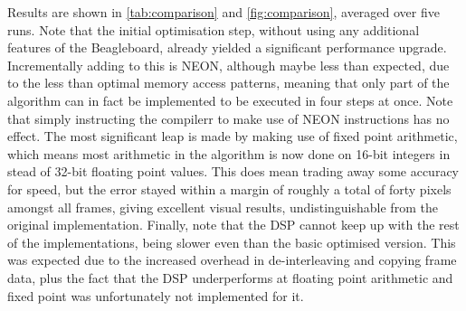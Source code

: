 \documentclass[final]{article}
\begin{document}
Results are shown in \cref{tab:comparison} and \cref{fig:comparison}, averaged over five runs. Note that the initial optimisation step, without using any additional features of the Beagleboard, already yielded a significant performance upgrade.
Incrementally adding to this is NEON, although maybe less than expected, due to the less than optimal memory access patterns, meaning that only part of the algorithm can in fact be implemented to be executed in four steps at once.
Note that simply instructing the compilerr to make use of NEON instructions has no effect.
The most significant leap is made by making use of fixed point arithmetic, which means most arithmetic in the algorithm is now done on 16-bit integers in stead of 32-bit floating point values.
This does mean trading away some accuracy for speed, but the error stayed within a margin of roughly a total of forty pixels amongst all frames, giving excellent visual results, undistinguishable from the original implementation.
Finally, note that the DSP cannot keep up with the rest of the implementations, being slower even than the basic optimised version. This was expected due to the increased overhead in de-interleaving and copying frame data, plus the fact that the DSP underperforms at floating point arithmetic and fixed point was unfortunately not implemented for it.
\end{document}
